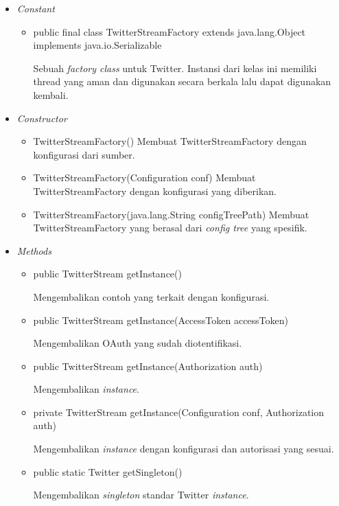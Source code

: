 	\begin{itemize}
		\item \textit{Constant}
		
		\begin{itemize}
			\item public final class TwitterStreamFactory
			extends java.lang.Object
			implements java.io.Serializable
			
			Sebuah \textit{factory class} untuk Twitter. Instansi dari kelas ini memiliki thread yang aman dan digunakan secara berkala lalu dapat digunakan kembali.
		\end{itemize}
		\item \textit{Constructor}
		
		\begin{itemize}
			\item TwitterStreamFactory()
			Membuat TwitterStreamFactory dengan konfigurasi dari sumber.
			\item TwitterStreamFactory(Configuration conf)
			Membuat TwitterStreamFactory dengan konfigurasi yang diberikan.
			\item TwitterStreamFactory(java.lang.String configTreePath)
			Membuat TwitterStreamFactory yang berasal dari \textit{config tree} yang spesifik.
		\end{itemize}
		\item \textit{Methods}
		
		\begin{itemize}
			\item public TwitterStream getInstance()
			
			Mengembalikan contoh yang terkait dengan konfigurasi.
			\item public TwitterStream getInstance(AccessToken accessToken)
			
			Mengembalikan OAuth yang sudah diotentifikasi.
			\item public TwitterStream getInstance(Authorization auth)
			
			Mengembalikan \textit{instance}.
			\item private TwitterStream getInstance(Configuration conf, Authorization auth)
			
			Mengembalikan \textit{instance} dengan konfigurasi dan autorisasi yang sesuai.
			\item public static Twitter getSingleton()
			
			Mengembalikan \textit{singleton} standar Twitter \textit{instance}.
		\end{itemize}
	\end{itemize}
